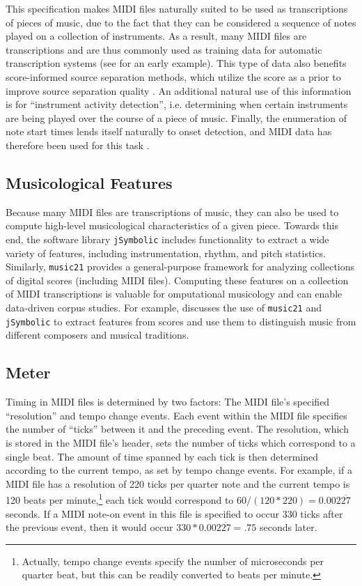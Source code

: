 \documentclass{article}
\begin{document}
This specification makes MIDI files naturally suited to be used as transcriptions of pieces of music, due to the fact that they can be considered a sequence of notes played on a collection of instruments.
As a result, many MIDI files are transcriptions and are thus commonly used as training data for automatic transcription systems (see \cite{turetsky2003ground} for an early example).
This type of data also benefits score-informed source separation methods, which utilize the score as a prior to improve source separation quality \cite{ewert2014score}.
An additional natural use of this information is for ``instrument activity detection'', i.e. determining when certain instruments are being played over the course of a piece of music.
Finally, the enumeration of note start times lends itself naturally to onset detection, and MIDI data has therefore been used for this task \cite{bello2005tutorial}.

\subsection{Musicological Features}

Because many MIDI files are transcriptions of music, they can also be used to compute high-level musicological characteristics of a given piece.
Towards this end, the software library \texttt{jSymbolic} \cite{mckay2006jsymbolic} includes functionality to extract a wide variety of features, including instrumentation, rhythm, and pitch statistics.
Similarly, \texttt{music21} \cite{cuthbert2010music21} provides a general-purpose framework for analyzing collections of digital scores (including MIDI files).
Computing these features on a collection of MIDI transcriptions is valuable for omputational musicology and can enable data-driven corpus studies.
For example, \cite{cuthbert2011feature} discusses the use of \texttt{music21} and \texttt{jSymbolic} to extract features from scores and use them to distinguish music from different composers and musical traditions.

\subsection{Meter}

Timing in MIDI files is determined by two factors: The MIDI file's specified ``resolution'' and tempo change events.
Each event within the MIDI file specifies the number of ``ticks'' between it and the preceding event.
The resolution, which is stored in the MIDI file's header, sets the number of ticks which correspond to a single beat.
The amount of time spanned by each tick is then determined according to the current tempo, as set by tempo change events.
For example, if a MIDI file has a resolution of 220 ticks per quarter note and the current tempo is 120 beats per minute,\footnote{Actually, tempo change events specify the number of microseconds per quarter beat, but this can be readily converted to beats per minute.} each tick would correspond to $60/(120*220) = 0.002\overline{27}$ seconds.
If a MIDI note-on event in this file is specified to occur 330 ticks after the previous event, then it would occur $330*0.002\overline{27} = .75$ seconds later.
\end{document}
